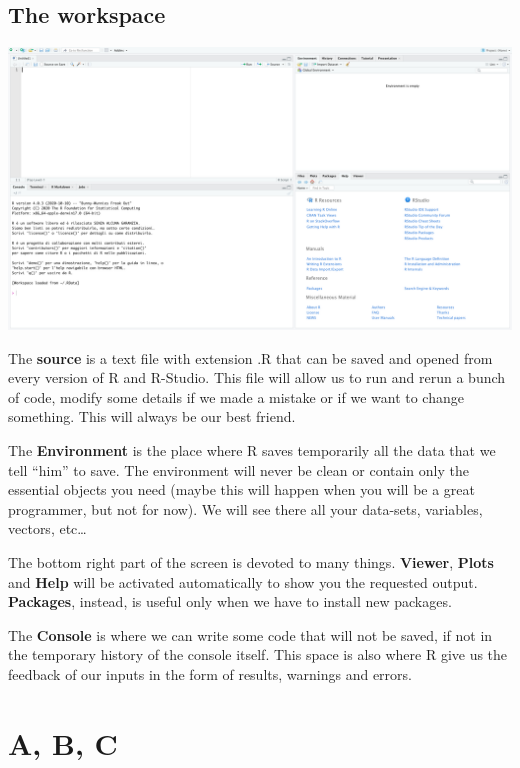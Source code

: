 \documentclass[
]{svmono}
\begin{document}
~

~

~

~

\hypertarget{the-workspace}{%
\section{The workspace}\label{the-workspace}}

\begin{center}\includegraphics[width=0.8\linewidth,]{images/workspace} \end{center}

The \textbf{source} is a text file with extension .R that can be saved and
opened from every version of R and R-Studio. This file will allow us to
run and rerun a bunch of code, modify some details if we made a mistake
or if we want to change something. This will always be our best friend.

The \textbf{Environment} is the place where R saves temporarily all the data
that we tell ``him'' to save. The environment will never be clean or
contain only the essential objects you need (maybe this will happen when
you will be a great programmer, but not for now). We will see there all
your data-sets, variables, vectors, etc\ldots{}

The bottom right part of the screen is devoted to many things.
\textbf{Viewer}, \textbf{Plots} and \textbf{Help} will be activated automatically to
show you the requested output. \textbf{Packages}, instead, is useful only
when we have to install new packages.

The \textbf{Console} is where we can write some code that will not be saved,
if not in the temporary history of the console itself. This space is
also where R give us the feedback of our inputs in the form of results,
warnings and errors.

\newpage

\hypertarget{a-b-c}{%
\chapter{A, B, C}\label{a-b-c}}
\end{document}
